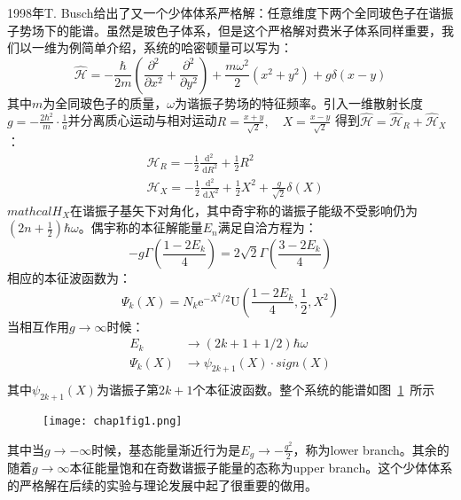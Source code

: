 1998年T. Busch给出了又一个少体体系严格解：任意维度下两个全同玻色子在谐振子势场下的能谱。虽然是玻色子体系，但是这个严格解对费米子体系同样重要，我们以一维为例简单介绍，系统的哈密顿量可以写为：
\begin{equation}
\hat{\mathcal{H}}=-\frac{\hbar}{2 m}\left(\frac{\partial^{2}}{\partial x^{2}}+\frac{\partial^{2}}{\partial y^{2}}\right)+\frac{m \omega^{2}}{2}\left(x^{2}+y^{2}\right)+g \delta(x-y)
\end{equation}
其中$m$为全同玻色子的质量，$\omega$为谐振子势场的特征频率。引入一维散射长度$g= -\frac{2\hbar^2}{m}\cdot\frac{1}{a}$并分离质心运动与相对运动$R = \frac{x+y}{\sqrt{2}}, \quad X = \frac{x-y}{\sqrt{2}}$
得到$\hat{\mathcal{H} } = \hat{\mathcal{H}}_R+ \hat{\mathcal{H}}_X$：
\begin{equation}
\begin{aligned}
&\mathcal{H}_{R}=-\frac{1}{2} \frac{\mathrm{d}^{2}}{\mathrm{~d} R^{2}}+\frac{1}{2} R^{2} \\
&\mathcal{H}_{X}=-\frac{1}{2} \frac{\mathrm{d}^{2}}{\mathrm{~d} X^{2}}+\frac{1}{2} X^{2}+\frac{g}{\sqrt{2}} \delta(X)
\end{aligned}
\end{equation}
$mathcal{H}_{X}$在谐振子基矢下对角化，其中奇宇称的谐振子能级不受影响仍为$(2n+\frac{1}{2})\hbar\omega$。偶宇称的本征解能量$E_n$满足自洽方程为：
\begin{equation}
	-g \Gamma\left(\frac{1-2 E_{k}}{4}\right)=2 \sqrt{2} \Gamma\left(\frac{3-2 E_{k}}{4}\right)
\end{equation}
相应的本征波函数为：
\begin{equation}
	\Psi_{k}(X)=N_{k} \mathrm{e}^{-X^{2} / 2} \mathrm{U}\left(\frac{1-2 E_{k}}{4}, \frac{1}{2}, X^{2}\right)
\end{equation}
当相互作用$g\to\infty$时候：
\begin{equation}
\begin{split}
	E_k &\to (2k+1+1/2)\hbar\omega\\
	\Psi_{k}(X) &\to \psi_{2k+1}(X)\cdot sign(X)\\
\end{split}
\end{equation}
其中$\psi_{2k+1}(X)$为谐振子第$2k+1$个本征波函数。整个系统的能谱如图~\ref{chap1fig1}~所示
\begin{figure}[!htbp]
    \centering
    \texttt{[image: chap1fig1.png]}
    \label{chap1fig1}
\end{figure}
其中当$g\to-\infty$时候，基态能量渐近行为是$E_g\to-\frac{g^2}{2}$，称为lower branch。其余的随着$g\to\infty$本征能量饱和在奇数谐振子能量的态称为upper branch。这个少体体系的严格解在后续的实验与理论发展中起了很重要的做用。

